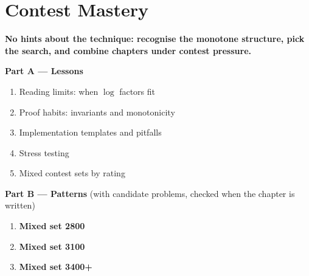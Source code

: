 \chapter{Contest Mastery}
\label{ch:mastery}

\begin{tcolorbox}[enhanced, colback=white, colframe=secondaryblue, boxrule=1pt, arc=2mm]
\textbf{\large\textcolor{primaryblue}{No hints about the technique: recognise the monotone structure, pick the search, and combine chapters under contest pressure.}}
\end{tcolorbox}


\begin{plannedbox}
\textbf{Part A --- Lessons}
\begin{enumerate}[leftmargin=*, label=\textbf{A\arabic*.}, itemsep=1pt]
    \item Reading limits: when $\log$ factors fit
    \item Proof habits: invariants and monotonicity
    \item Implementation templates and pitfalls
    \item Stress testing
    \item Mixed contest sets by rating
\end{enumerate}
\textbf{Part B --- Patterns} (with candidate problems, checked when the chapter is written)
\begin{enumerate}[leftmargin=*, label=\textbf{P\arabic*.}, itemsep=1pt]
    \item \textbf{Mixed set 2800}
    \item \textbf{Mixed set 3100}
    \item \textbf{Mixed set 3400+}
\end{enumerate}
\end{plannedbox}
